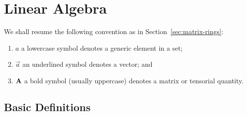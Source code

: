 \section{Linear Algebra}\label{sec:linear-algebra}

\begin{remark}
    We shall resume the following convention as in Section~\ref{sec:matrix-rings}:
    \begin{enumerate}[label={(\roman*)}, itemsep=0mm]
        \item \(a\) a lowercase symbol denotes a generic element in a set;
        \item \(\vec{a}\) an underlined symbol denotes a vector; and
        \item \(\vb{A}\) a bold symbol (usually uppercase)
            denotes a matrix or tensorial quantity.
    \end{enumerate}
\end{remark}

\subsection{Basic Definitions}

